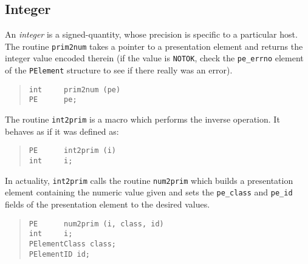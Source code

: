 \subsection	{Integer}
An {\em integer\/} is a signed-quantity, whose precision is specific to a
particular host.
The routine \verb"prim2num" takes a pointer to a presentation element and
returns the integer value
encoded therein (if the value is \verb"NOTOK", check the \verb"pe_errno"
element of the \verb"PElement" structure to see if there really was an error).
\begin{quote}\small\begin{verbatim}
int     prim2num (pe)
PE      pe;
\end{verbatim}\end{quote}
The routine \verb"int2prim" is a macro which performs the inverse operation.
It behaves as if it was defined as:
\begin{quote}\small\begin{verbatim}
PE      int2prim (i)
int     i;
\end{verbatim}\end{quote}
In actuality,
\verb"int2prim" calls the routine \verb"num2prim" which builds a presentation
element containing the numeric value given and sets the \verb"pe_class" and
\verb"pe_id" fields of the presentation element to the desired values.
\begin{quote}\small\begin{verbatim}
PE      num2prim (i, class, id)
int     i;
PElementClass class;
PElementID id;
\end{verbatim}\end{quote}

